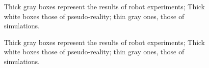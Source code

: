 \documentclass{article}
\begin{document}
\begin{figure}[t]
\centering

\hfill

\hfill

\caption{
Thick gray boxes represent the results of robot experiments;
Thick white boxes those of pseudo-reality; thin gray ones,
those of simulations.}
\end{figure}

\begin{figure}[t]
\centering

\hfill

\caption{
Thick gray boxes represent the results of robot experiments;
Thick white boxes those of pseudo-reality; thin gray ones,
those of simulations.}
\label{fig:task1res}
\end{figure}
\end{document}
